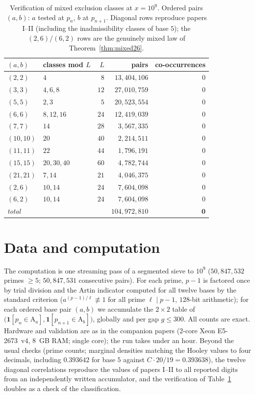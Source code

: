 \documentclass[11pt,reqno]{amsart}
\theoremstyle{plain}
\theoremstyle{definition}
\newcommand{\Art}{\mathrm{A}}
\begin{document}
\begin{table}[t]
\centering
\caption{Verification of mixed exclusion classes at $x = 10^9$. Ordered pairs
$(a, b)$: $a$ tested at $p_n$, $b$ at $p_{n+1}$. Diagonal rows reproduce
papers I--II (including the inadmissibility classes of base $5$); the
$(2,6)/(6,2)$ rows are the genuinely mixed law of Theorem~\ref{thm:mixed26}.}
\label{tab:verification}
\begin{tabular}{llrrr}
\toprule
$(a, b)$ & classes mod $L$ & $L$ & pairs & co-occurrences \\
\midrule
$(2,2)$   & $4$          & $8$  & $13{,}404{,}106$ & $0$ \\
$(3,3)$   & $4, 6, 8$    & $12$ & $27{,}010{,}759$ & $0$ \\
$(5,5)$   & $2, 3$       & $5$  & $20{,}523{,}554$ & $0$ \\
$(6,6)$   & $8, 12, 16$  & $24$ & $12{,}419{,}039$ & $0$ \\
$(7,7)$   & $14$         & $28$ & $3{,}567{,}335$  & $0$ \\
$(10,10)$ & $20$         & $40$ & $2{,}214{,}511$  & $0$ \\
$(11,11)$ & $22$         & $44$ & $1{,}796{,}191$  & $0$ \\
$(15,15)$ & $20, 30, 40$ & $60$ & $4{,}782{,}744$  & $0$ \\
$(21,21)$ & $7, 14$      & $21$ & $4{,}046{,}375$  & $0$ \\
$(2,6)$   & $10, 14$     & $24$ & $7{,}604{,}098$  & $0$ \\
$(6,2)$   & $10, 14$     & $24$ & $7{,}604{,}098$  & $0$ \\
\midrule
\emph{total} & & & $104{,}972{,}810$ & $\mathbf{0}$ \\
\bottomrule
\end{tabular}
\end{table}

\section{Data and computation}
\label{sec:data}

The computation is one streaming pass of a segmented sieve to $10^9$
($50{,}847{,}532$ primes $\ge 5$; $50{,}847{,}531$ consecutive pairs). For
each prime, $p - 1$ is factored once by trial division and the Artin
indicator computed for all twelve bases by the standard criterion
($a^{(p-1)/\ell} \not\equiv 1$ for all prime $\ell \mid p-1$, $128$-bit
arithmetic); for each ordered base pair $(a, b)$ we accumulate the
$2 \times 2$ table of $\bigl(\mathbf{1}[p_n \in \Art_a],
\mathbf{1}[p_{n+1} \in \Art_b]\bigr)$, globally and per gap $g \le 300$. All
counts are exact. Hardware and validation are as in the companion papers
($2$-core Xeon E5-2673~v4, $8$~GB RAM; single core); the run takes under an
hour. Beyond the usual checks (prime counts; marginal densities matching the
Hooley values to four decimals, including $0.393642$ for base $5$ against
$C \cdot 20/19 = 0.393638$), the twelve diagonal correlations reproduce the
values of papers I--II to all reported digits from an independently written
accumulator, and the verification of Table~\ref{tab:verification} doubles as
a check of the classification.
\end{document}
